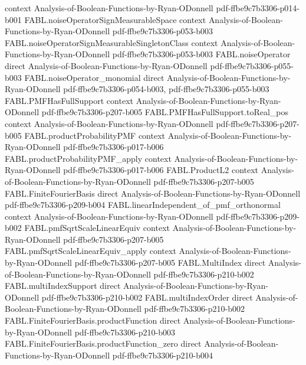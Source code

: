 \begin{theorem}
  {context}
  {Analysis-of-Boolean-Functions-by-Ryan-ODonnell}
  {pdf-ffbe9c7b3306-p014-b001}
\proofstep
  {FABL.noiseOperatorSignMeasurableSpace}
  {context}
  {Analysis-of-Boolean-Functions-by-Ryan-ODonnell}
  {pdf-ffbe9c7b3306-p053-b003}
\proofstep
  {FABL.noiseOperatorSignMeasurableSingletonClass}
  {context}
  {Analysis-of-Boolean-Functions-by-Ryan-ODonnell}
  {pdf-ffbe9c7b3306-p053-b003}
\proofstep
  {FABL.noiseOperator}
  {direct}
  {Analysis-of-Boolean-Functions-by-Ryan-ODonnell}
  {pdf-ffbe9c7b3306-p055-b003}
\proofstep
  {FABL.noiseOperator_monomial}
  {direct}
  {Analysis-of-Boolean-Functions-by-Ryan-ODonnell}
  {pdf-ffbe9c7b3306-p054-b003,
    pdf-ffbe9c7b3306-p055-b003}
\proofstep
  {FABL.PMFHasFullSupport}
  {context}
  {Analysis-of-Boolean-Functions-by-Ryan-ODonnell}
  {pdf-ffbe9c7b3306-p207-b005}
\proofstep
  {FABL.PMFHasFullSupport.toReal_pos}
  {context}
  {Analysis-of-Boolean-Functions-by-Ryan-ODonnell}
  {pdf-ffbe9c7b3306-p207-b005}
\proofstep
  {FABL.productProbabilityPMF}
  {context}
  {Analysis-of-Boolean-Functions-by-Ryan-ODonnell}
  {pdf-ffbe9c7b3306-p017-b006}
\proofstep
  {FABL.productProbabilityPMF_apply}
  {context}
  {Analysis-of-Boolean-Functions-by-Ryan-ODonnell}
  {pdf-ffbe9c7b3306-p017-b006}
\proofstep
  {FABL.ProductL2}
  {context}
  {Analysis-of-Boolean-Functions-by-Ryan-ODonnell}
  {pdf-ffbe9c7b3306-p207-b005}
\proofstep
  {FABL.FiniteFourierBasis}
  {direct}
  {Analysis-of-Boolean-Functions-by-Ryan-ODonnell}
  {pdf-ffbe9c7b3306-p209-b004}
\proofstep
  {FABL.linearIndependent_of_pmf_orthonormal}
  {context}
  {Analysis-of-Boolean-Functions-by-Ryan-ODonnell}
  {pdf-ffbe9c7b3306-p209-b002}
\proofstep
  {FABL.pmfSqrtScaleLinearEquiv}
  {context}
  {Analysis-of-Boolean-Functions-by-Ryan-ODonnell}
  {pdf-ffbe9c7b3306-p207-b005}
\proofstep
  {FABL.pmfSqrtScaleLinearEquiv_apply}
  {context}
  {Analysis-of-Boolean-Functions-by-Ryan-ODonnell}
  {pdf-ffbe9c7b3306-p207-b005}
\proofstep
  {FABL.MultiIndex}
  {direct}
  {Analysis-of-Boolean-Functions-by-Ryan-ODonnell}
  {pdf-ffbe9c7b3306-p210-b002}
\proofstep
  {FABL.multiIndexSupport}
  {direct}
  {Analysis-of-Boolean-Functions-by-Ryan-ODonnell}
  {pdf-ffbe9c7b3306-p210-b002}
\proofstep
  {FABL.multiIndexOrder}
  {direct}
  {Analysis-of-Boolean-Functions-by-Ryan-ODonnell}
  {pdf-ffbe9c7b3306-p210-b002}
\proofstep
  {FABL.FiniteFourierBasis.productFunction}
  {direct}
  {Analysis-of-Boolean-Functions-by-Ryan-ODonnell}
  {pdf-ffbe9c7b3306-p210-b003}
\proofstep
  {FABL.FiniteFourierBasis.productFunction_zero}
  {direct}
  {Analysis-of-Boolean-Functions-by-Ryan-ODonnell}
  {pdf-ffbe9c7b3306-p210-b004}

\end{theorem}
